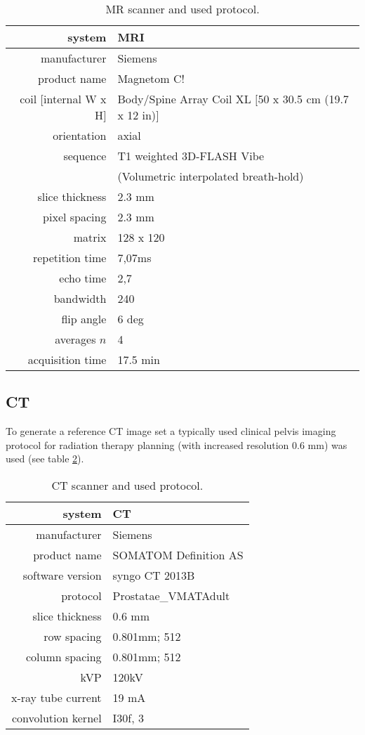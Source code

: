 \begin{table}[!tbh]
\centering
\caption{MR scanner and used protocol.}
\begin{tabular}{r|l}
system			& MRI				\\
\toprule
manufacturer	& Siemens			\\
product name	& Magnetom C!		\\
coil $[$internal W x H$]$	& Body/Spine Array Coil XL $[$50 x 30.5 cm (19.7 x 12 in)$]$	\\
orientation		& axial	\\
sequence		& T1 weighted 3D-FLASH Vibe	\\
				& (Volumetric interpolated breath-hold)	\\
slice thickness	& 2.3 mm	\\
pixel spacing	& 2.3 mm	\\
matrix			& 128 x 120 \\
repetition time & 7,07ms	\\
echo time		& 2,7	\\
bandwidth		& 240	\\
flip angle		& 6 deg	\\
averages $n$	& 4	\\
acquisition time& 17.5 min
\end{tabular}
\label{tab:MR-scanner}
\end{table}


\subsection{CT}
To generate a reference CT image set a typically used clinical pelvis imaging protocol for radiation therapy planning (with increased resolution 0.6 mm) was used (see table \ref{tab:CT-scanner}).

\begin{table}[!tbh]
\centering
\caption{CT scanner and used protocol.}
\begin{tabular}{r|l}
system			& CT				\\
\toprule
manufacturer	& Siemens			\\
product name	& SOMATOM Definition AS		\\
software version& syngo CT 2013B	\\
protocol		& Prostatae\_VMATAdult	\\
slice thickness	& 0.6 mm	\\
row spacing		& 0.801mm; 512	\\
column spacing	& 0.801mm; 512	\\
kVP				& 120kV	\\
x-ray tube current	&	19 mA	\\
convolution kernel	&	I30f, 3
\end{tabular}
\label{tab:CT-scanner}
\end{table}


